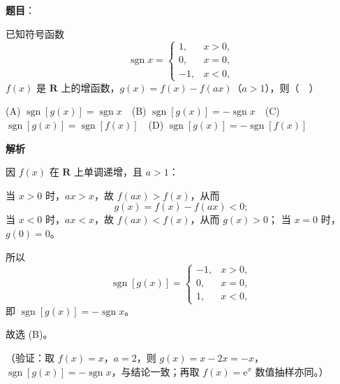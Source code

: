 \begin{answer}

\textbf{题目}：

已知符号函数
\nopagebreak[4]
\[
\operatorname{sgn}x=\begin{cases}
1, & x>0,\\
0, & x=0,\\
-1, & x<0,
\end{cases}
\]
\(f(x)\) 是 \(\mathbf{R}\) 上的增函数，\(g(x)=f(x)-f(ax)\)（\(a>1\)），则（　）

(A) \(\operatorname{sgn}[g(x)]=\operatorname{sgn}x\)　(B) \(\operatorname{sgn}[g(x)]=-\operatorname{sgn}x\)　(C) \(\operatorname{sgn}[g(x)]=\operatorname{sgn}[f(x)]\)　(D) \(\operatorname{sgn}[g(x)]=-\operatorname{sgn}[f(x)]\)

\textbf{解析}

因 \(f(x)\) 在 \(\mathbf{R}\) 上单调递增，且 \(a>1\)：

当 \(x>0\) 时，\(ax>x\)，故 \(f(ax)>f(x)\)，从而
\nopagebreak[4]
\[
g(x)=f(x)-f(ax)<0;
\]
当 \(x<0\) 时，\(ax<x\)，故 \(f(ax)<f(x)\)，从而 \(g(x)>0\)；
当 \(x=0\) 时，\(g(0)=0\)。

所以
\nopagebreak[4]
\[
\operatorname{sgn}[g(x)]=\begin{cases}
-1, & x>0,\\
0, & x=0,\\
1, & x<0,
\end{cases}
\]
即 \(\operatorname{sgn}[g(x)]=-\operatorname{sgn}x\)。

故选 (B)。

（验证：取 \(f(x)=x\)，\(a=2\)，则 \(g(x)=x-2x=-x\)，\(\operatorname{sgn}[g(x)]=-\operatorname{sgn}x\)，与结论一致；再取 \(f(x)=\mathrm{e}^x\) 数值抽样亦同。）


\end{answer}
